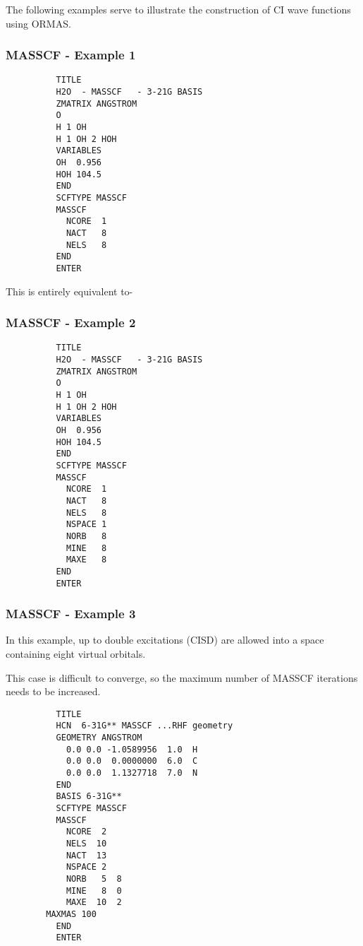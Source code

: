 \documentclass[11pt,fleqn]{article}
\begin{document}
The following examples serve to illustrate the construction of CI 
wave functions using ORMAS.\\

\subsubsection{MASSCF - Example 1}
{
\footnotesize
\begin{verbatim}
          TITLE
          H2O  - MASSCF   - 3-21G BASIS
          ZMATRIX ANGSTROM
          O
          H 1 OH
          H 1 OH 2 HOH
          VARIABLES
          OH  0.956
          HOH 104.5 
          END
          SCFTYPE MASSCF
          MASSCF
            NCORE  1
            NACT   8
            NELS   8
          END
          ENTER
\end{verbatim}
}

This is entirely equivalent to-

\subsubsection{MASSCF - Example 2}
{
\footnotesize
\begin{verbatim}
          TITLE
          H2O  - MASSCF   - 3-21G BASIS
          ZMATRIX ANGSTROM
          O
          H 1 OH
          H 1 OH 2 HOH
          VARIABLES
          OH  0.956
          HOH 104.5 
          END
          SCFTYPE MASSCF
          MASSCF
            NCORE  1
            NACT   8
            NELS   8
            NSPACE 1
            NORB   8
            MINE   8
            MAXE   8
          END
          ENTER
\end{verbatim}
}

\subsubsection{MASSCF - Example 3}
In this example, up to double excitations (CISD) are allowed into a 
space containing eight virtual orbitals.

This case is difficult to converge, so the maximum number of MASSCF iterations
needs to be increased.

{
\footnotesize
\begin{verbatim}
          TITLE
          HCN  6-31G** MASSCF ...RHF geometry 
          GEOMETRY ANGSTROM
            0.0 0.0 -1.0589956  1.0  H
            0.0 0.0  0.0000000  6.0  C
            0.0 0.0  1.1327718  7.0  N
          END
          BASIS 6-31G**
          SCFTYPE MASSCF
          MASSCF
            NCORE  2
            NELS  10
            NACT  13
            NSPACE 2
            NORB   5  8
            MINE   8  0
            MAXE  10  2
	    MAXMAS 100
          END
          ENTER
\end{verbatim}
} 
\end{document}
